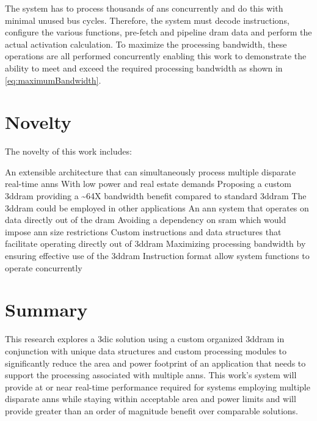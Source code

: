 The system has to process thousands of \acp{an} concurrently and do this with minimal unused bus cycles.
Therefore, the system must decode instructions, configure the various functions, pre-fetch and pipeline \ac{dram} data and perform the actual activation calculation. 
To maximize the processing bandwidth, these operations are all performed concurrently enabling this work to demonstrate the ability to meet and exceed the required \iffalse \SI[per-mode=symbol]{32}{\tera \bit \per \second} of\fi processing bandwidth as shown in \eqref{eq:maximumBandwidth}.

\iffalse
The problem associated with processing \acp{ann} are outlined in Section \ref{sec:The Problem}. 
\fi

\section[Novelty]{Novelty}
\label{sec:Novelty}

The novelty of this work includes:
\begin{outline}
    \1 An extensible architecture that can simultaneously process multiple disparate real-time \ac{ann}s 
      \2 With low power and real estate demands
    \1 Proposing a custom \ac{3ddram} providing a \textasciitilde 64X bandwidth benefit compared to standard \ac{3ddram}
      \2 The \ac{3ddram} could be employed in other applications
    \1 An \ac{ann} system that operates on data directly out of the \ac{dram}
      \2 Avoiding a dependency on \ac{sram} which would impose \ac{ann} size restrictions
    \1 Custom instructions and data structures that facilitate operating directly out of \ac{3ddram} 
      \2 Maximizing processing bandwidth by ensuring effective use of the \ac{3ddram}
      \2 Instruction format allow system functions to operate concurrently 
\end{outline}


\section[Summary]{Summary}
\label{sec:Summary}

This research explores a \ac{3dic} solution using a custom organized \ac{3ddram} in conjunction with unique data structures and custom processing modules to significantly reduce the 
area and power footprint of an application that needs to support the processing associated with multiple \ac{ann}s.
This work's system will provide at or near real-time performance required for systems employing multiple disparate \ac{ann}s while staying within acceptable area and power limits and will provide greater than an order of magnitude benefit over comparable solutions.

